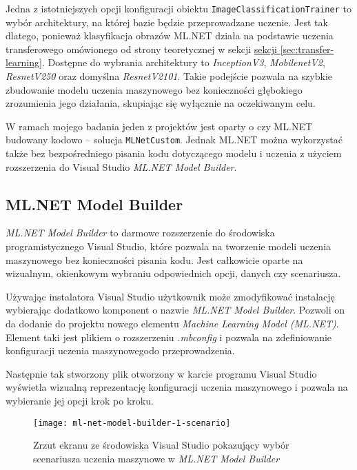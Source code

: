 Jedna z istotniejszych opcji konfiguracji obiektu \lstinline{ImageClassificationTrainer} to wybór architektury, na której bazie będzie przeprowadzane uczenie.
Jest tak dlatego, ponieważ klasyfikacja obrazów ML.NET działa na podstawie uczenia transferowego omówionego od strony teoretycznej w sekcji \hyperref[sec:transfer-learning]{sekcji \ref*{sec:transfer-learning}}.
Dostępne do wybrania architektury to \emph{InceptionV3}, \emph{MobilenetV2}, \emph{ResnetV250} oraz domyślna \emph{ResnetV2101}.
Takie podejście pozwala na szybkie zbudowanie modelu uczenia maszynowego bez konieczności głębokiego zrozumienia jego działania, skupiając się wyłącznie na oczekiwanym celu.

W ramach mojego badania jeden z projektów jest oparty o czy ML.NET budowany kodowo -- solucja \lstinline{MLNetCustom}.
Jednak ML.NET można wykorzystać także bez bezpośredniego pisania kodu dotyczącego modelu i uczenia z użyciem rozszerzenia do Visual Studio \emph{ML.NET Model Builder}.

\subsection{ML.NET Model Builder}

\emph{ML.NET Model Builder} to darmowe rozszerzenie do środowiska programistycznego Visual Studio, które pozwala na tworzenie modeli uczenia maszynowego bez konieczności pisania kodu.
Jest całkowicie oparte na wizualnym, okienkowym wybraniu odpowiednich opcji, danych czy scenariusza.

Używając instalatora Visual Studio użytkownik może zmodyfikować instalację wybierając dodatkowo komponent o nazwie \emph{ML.NET Model Builder}.
Pozwoli on da dodanie do projektu nowego elementu \emph{Machine Learning Model (ML.NET)}.
Element taki jest plikiem o rozszerzeniu \emph{.mbconfig} i pozwala na zdefiniowanie konfiguracji uczenia maszynowegodo przeprowadzenia.

Następnie tak stworzony plik otworzony w karcie programu Visual Studio wyświetla wizualną reprezentację konfiguracji uczenia maszynowego i pozwala na wybieranie jej opcji krok po kroku.

\begin{figure}[ht]
  \texttt{[image: ml-net-model-builder-1-scenario]}
  \caption{Zrzut ekranu ze środowiska Visual Studio pokazujący wybór scenariusza uczenia maszynowe w \emph{ML.NET Model Builder}}
  \label{fig:ml-net-model-builder-1-scenario}
\end{figure}

